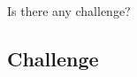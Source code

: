 \documentclass[aspectratio=169]{beamer}
\begin{document}
\begin{frame}{Is there any challenge?}
\end{frame}

\subsection{Challenge}
\end{document}
